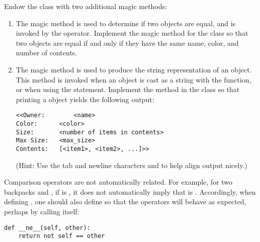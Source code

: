 \begin{problem} %
Endow the  class with two additional magic methods:
\begin{enumerate}
\item The  magic method is used to determine if two objects are equal, and is invoked by the \li{==} operator.
Implement the  magic method for the  class so that two  objects are equal if and only if they have the same name, color, and number of contents.

\item The  magic method is used to produce the string representation of an object.
This method is invoked when an object is cast as a string with the  function, or when using the  statement.
Implement the  method in the  class so that printing a  object yields the following output:
\begin{lstlisting}
<<Owner:		<name>
Color:		<color>
Size:       <number of items in contents>
Max Size:   <max_size>
Contents:   [<item1>, <item2>, ...]>>
\end{lstlisting}
(Hint: Use the tab and newline characters  and  to help align output nicely.)
\end{enumerate}
\end{problem}

\begin{warn}
Comparison operators are not automatically related.
For example, for two backpacks  and , if  is , it does not automatically imply that  is .
Accordingly, when defining , one should also define  so that the operators will behave as expected, perhaps by calling  itself:
\begin{lstlisting}
def __ne__(self, other):
    return not self == other
\end{lstlisting}
\end{warn}

